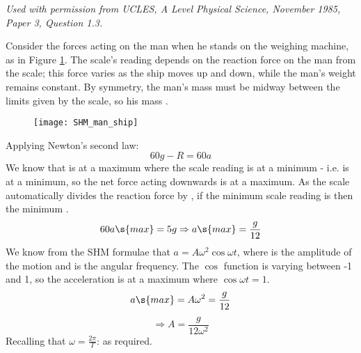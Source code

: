 
\begin{problem}[IntA1985PSIIIQ1p] %
{ 
}
{\textit{Used with permission from UCLES, A Level Physical Science, November 1985, Paper 3, Question 1.3.}}
{Consider the forces acting on the man when he stands on the weighing machine, as in Figure \ref{fig:SHM_man_ship}. The scale's reading depends on the reaction force  on the man from the scale; this force varies as the ship moves up and down, while the man's weight remains constant. By symmetry, the man's mass must be midway between the limits given by the scale, so his mass .
\begin{figure}
	\centering
	\texttt{[image: SHM\_man\_ship]}
	\caption{}
	\label{fig:SHM_man_ship}
\end{figure}

\nl Applying Newton's second law:
\begin{equation*}
60g - R = 60a
\end{equation*}
We know that  is at a maximum where the scale reading is at a minimum - i.e. is at a minimum, so the net force acting downwards is at a maximum. As the scale automatically divides the reaction force by , if the minimum scale reading is  then the minimum .
\begin{equation*}
60a\s{max} = 5g \Rightarrow a\s{max} = \frac{g}{12}
\end{equation*}
We know from the SHM formulae that $a = A\omega^2\cos{\omega t}$, where  is the amplitude of the motion and \vari{\omega} is the angular frequency. The $\cos$ function is varying between -1 and 1, so the acceleration is at a maximum where $\cos{\omega t} = 1$.
\begin{equation*}
a\s{max} = A\omega^2 = \frac{g}{12}
\end{equation*}
\begin{equation*}
\Rightarrow A = \frac{g}{12\omega^2}
\end{equation*}
Recalling that $\omega = \frac{2\pi}{T}$:
as required.
}
\end{problem}